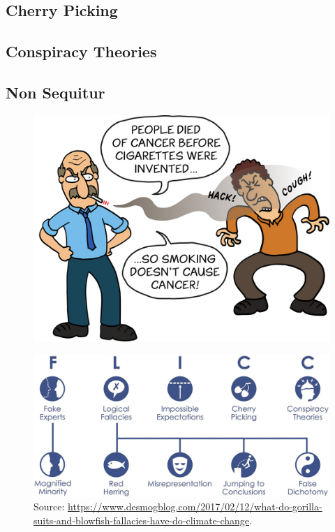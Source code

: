\documentclass{article}\usepackage[]{graphicx}\usepackage[]{color}
\begin{document}
\subsection{Cherry Picking}

\subsection{Conspiracy Theories}

\subsection{Non Sequitur}

\begin{figure}
\includegraphics[scale=0.3]{../graphics/smoking-non-sequitur}
\end{figure}


\begin{figure}
\includegraphics[scale=0.2]{../graphics/skeptical-science-five-traits-science-denial-graphic_creative-commons}
\caption{Source: \url{https://www.desmogblog.com/2017/02/12/what-do-gorilla-suits-and-blowfish-fallacies-have-do-climate-change}.}
\end{figure}
\end{document}
